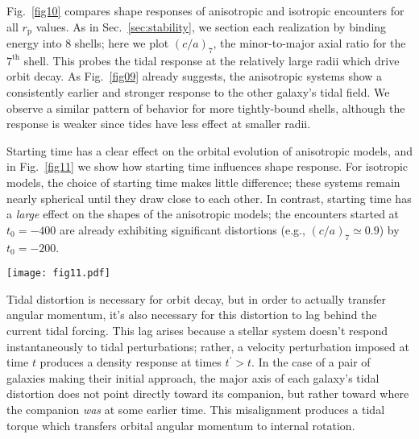 \documentclass[fleqn,usenatbib]{mnras}
\begin{document}
Fig.~\ref{fig10} compares shape responses of anisotropic and isotropic encounters for all $r_\mathrm{p}$ values. As in Sec.~\ref{sec:stability}, we section each realization by binding energy into $8$ shells; here we plot $(c/a)_{7}$, the minor-to-major axial ratio for the $7^\mathrm{th}$ shell. This probes the tidal response at the relatively large radii which drive orbit decay. As Fig.~\ref{fig09} already suggests, the anisotropic systems show a consistently earlier and stronger response to the other galaxy's tidal field. We observe a similar pattern of behavior for more tightly-bound shells, although the response is weaker since tides have less effect at smaller radii. 

Starting time has a clear effect on the orbital evolution of anisotropic models, and in Fig.~\ref{fig11} we show how starting time influences shape response. For isotropic models, the choice of starting time makes little difference; these systems remain nearly spherical until they draw close to each other. In contrast, starting time has a \textit{large} effect on the shapes of the anisotropic models; the encounters started at $t_{0} = -400$ are already exhibiting significant distortions (e.g., $(c/a)_{7} \simeq 0.9$) by $t_{0} = -200$.

\begin{figure*}
    \centering
    \texttt{[image: fig11.pdf]}
    \caption{Effect of starting time on shape.  Dotted lines show simulations with $t_{0}=-400$, while solid lines show the matching simulations with $t_{0} = -200$. The vertical scaling and colors match Fig.~\ref{fig10}; to reduce clutter, individual runs are not plotted. Starting time has little effect on the shapes of isotropic models (grey); in contrast, starting earlier markedly increases the distortion of the anisotropic models (red).}
    \label{fig11}
\end{figure*}

Tidal distortion is necessary for orbit decay, but in order to actually transfer angular momentum, it's also necessary for this distortion to lag behind the current tidal forcing. This lag arises because a stellar system doesn't respond instantaneously to tidal perturbations; rather, a velocity perturbation imposed at time $t$ produces a density response at times $t^\prime > t$. In the case of a pair of galaxies making their initial approach, the major axis of each galaxy's tidal distortion does not point directly toward its companion, but rather toward where the companion \textit{was} at some earlier time. This misalignment produces a tidal torque which transfers orbital angular momentum to internal rotation.
\end{document}
